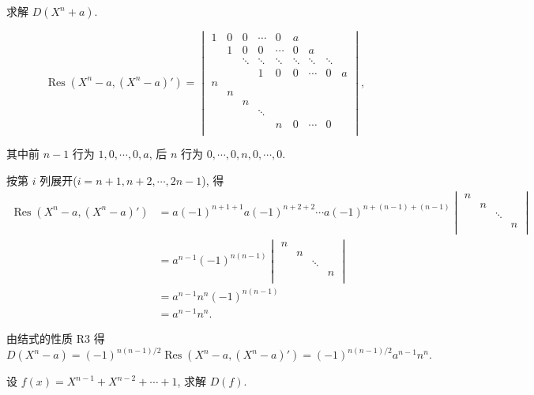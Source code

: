 \documentclass[UTF8]{ctexart}
\begin{document}
\begin{exercise}\label{ex2.8}
    求解 $D(X^n+a)$.
\end{exercise}
\begin{solution}
    \[\operatorname{Res}(X^n-a,(X^n-a)')=\begin{vmatrix}
        1 & 0 & 0 & \cdots & 0 & a \\
        & 1 & 0 & 0 & \cdots & 0 & a \\
        && \ddots & \ddots & \ddots & \ddots & \ddots & \ddots \\
        &&& 1 & 0 & 0 & \cdots & 0 & a \\
        n \\
        & n \\
        && n \\
        &&& \ddots \\
        &&&& n & 0 & \cdots & 0 \\
    \end{vmatrix},\]

    其中前 $n-1$ 行为 $1,0,\cdots,0,a$, 后 $n$ 行为 $0,\cdots,0,n,0,\cdots,0$.

    按第 $i$ 列展开($i=n+1,n+2,\cdots,{2n-1}$), 得
    \begin{align*}
        \operatorname{Res}(X^n-a,(X^n-a)') & =a(-1)^{n+1+1}a(-1)^{n+2+2}\cdots a(-1)^{n+(n-1)+(n-1)}\begin{vmatrix}
            n \\
            & n \\
            && \ddots \\
            &&& n \\
        \end{vmatrix} \\
        & =a^{n-1}(-1)^{n(n-1)}\begin{vmatrix}
            n \\
            & n \\
            && \ddots \\
            &&& n \\
        \end{vmatrix} \\
        & =a^{n-1}n^n(-1)^{n(n-1)} \\
        & =a^{n-1}n^n.
    \end{align*}

    由结式的性质 R3 得
    \[D(X^n-a)=(-1)^{n(n-1)/2}\operatorname{Res}(X^n-a,(X^n-a)')=(-1)^{n(n-1)/2}a^{n-1}n^n.\]
\end{solution}
\begin{exercise}[2.9]
    设 $f(x)=X^{n-1}+X^{n-2}+\cdots+1$, 求解 $D(f)$.
\end{exercise}
\end{document}
